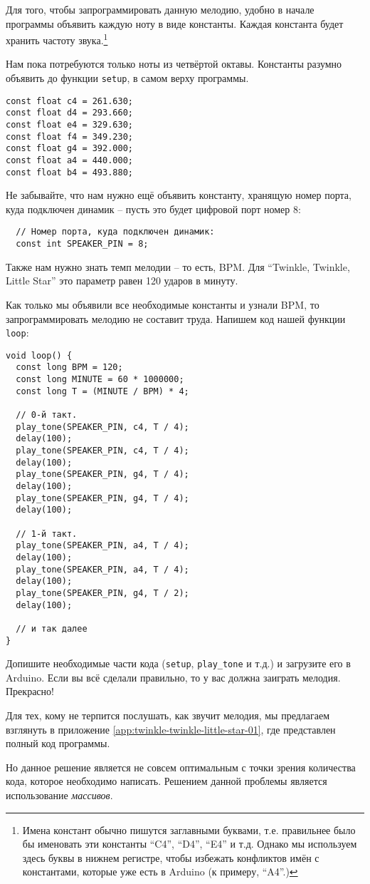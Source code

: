 \documentclass[../sparc.tex]{subfiles}
\begin{document}

Для того, чтобы запрограммировать данную мелодию, удобно в начале программы
объявить каждую ноту в виде константы. Каждая константа будет хранить частоту
звука.\footnote{Имена констант обычно пишутся заглавными буквами, т.е.
правильнее было бы именовать эти константы ``C4'', ``D4'', ``E4'' и т.д. Однако мы
используем здесь буквы в нижнем регистре, чтобы избежать конфликтов имён с
константами, которые уже есть в Arduino (к примеру, ``A4''.)}

Нам пока потребуются только ноты из четвёртой октавы. Константы разумно объявить
до функции \texttt{setup}, в самом верху программы.

\begin{verbatim}
const float c4 = 261.630;
const float d4 = 293.660;
const float e4 = 329.630;
const float f4 = 349.230;
const float g4 = 392.000;
const float a4 = 440.000;
const float b4 = 493.880;
\end{verbatim}

Не забывайте, что нам нужно ещё объявить константу, хранящую номер порта, куда
подключен динамик -- пусть это будет цифровой порт номер 8:

\begin{verbatim}
  // Номер порта, куда подключен динамик:
  const int SPEAKER_PIN = 8;
\end{verbatim}

Также нам нужно знать темп мелодии -- то есть, BPM. Для ``Twinkle, Twinkle,
Little Star'' это параметр равен 120 ударов в минуту.

Как только мы объявили все необходимые константы и узнали BPM, то
запрограммировать мелодию не составит труда.  Напишем код нашей функции
\texttt{loop}:

\begin{verbatim}
void loop() {
  const long BPM = 120;
  const long MINUTE = 60 * 1000000;
  const long T = (MINUTE / BPM) * 4;

  // 0-й такт.
  play_tone(SPEAKER_PIN, c4, T / 4);
  delay(100);
  play_tone(SPEAKER_PIN, c4, T / 4);
  delay(100);
  play_tone(SPEAKER_PIN, g4, T / 4);
  delay(100);
  play_tone(SPEAKER_PIN, g4, T / 4);
  delay(100);

  // 1-й такт.
  play_tone(SPEAKER_PIN, a4, T / 4);
  delay(100);
  play_tone(SPEAKER_PIN, a4, T / 4);
  delay(100);
  play_tone(SPEAKER_PIN, g4, T / 2);
  delay(100);

  // и так далее
}
\end{verbatim}

Допишите необходимые части кода (\texttt{setup}, \texttt{play\_tone} и т.д.) и
загрузите его в Arduino. Если вы всё сделали правильно, то у вас должна заиграть
мелодия. Прекрасно!

Для тех, кому не терпится послушать, как звучит мелодия, мы предлагаем взглянуть
в приложение \ref{app:twinkle-twinkle-little-star-01}, где представлен полный
код программы.

Но данное решение является не совсем оптимальным с точки зрения количества кода,
которое необходимо написать. Решением данной проблемы является использование
\emph{массивов}.
\end{document}
